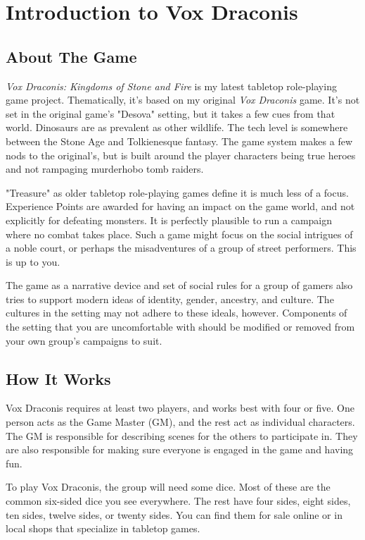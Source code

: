 \chapter{Introduction to Vox Draconis}

\begin{multicols}{2}

\section{About The Game}

\textit{Vox Draconis: Kingdoms of Stone and Fire} is my latest tabletop
role-playing game project. Thematically, it's based on my original \textit{Vox
Draconis} game. It's not set in the original game's
"Desova" setting, but it takes a few cues from that world. Dinosaurs
are as prevalent as other wildlife. The tech level is somewhere between
the Stone Age and Tolkienesque fantasy. The game system makes a few nods
to the original's, but is built around the player characters being true
heroes and not rampaging murderhobo tomb raiders.

"Treasure" as older tabletop role-playing games define it is much less
of a focus. Experience Points are awarded for having an impact on the
game world, and not explicitly for defeating monsters. It is perfectly
plausible to run a campaign where no combat takes place. Such a game
might focus on the social intrigues of a noble court, or perhaps the
misadventures of a group of street performers. This is up to you.

The game as a narrative device and set of social rules for a group of gamers
also tries to support modern ideas of identity, gender, ancestry, and culture.
The cultures in the setting may not adhere to these ideals, however. Components
of the setting that you are uncomfortable with should be modified or removed
from your own group's campaigns to suit.

\section{How It Works}

Vox Draconis requires at least two players, and works best with four or five.
One person acts as the Game Master (GM), and the rest act as individual characters. The
GM is responsible for describing scenes for the others to participate in.
They are also responsible for making sure everyone is engaged in the game and
having fun.

To play Vox Draconis, the group will need some dice. Most of these are the common
six-sided dice you see everywhere. The rest have four sides, eight sides, ten sides,
twelve sides, or twenty sides. You can find them for sale online or in
local shops that specialize in tabletop games.


\end{multicols}
